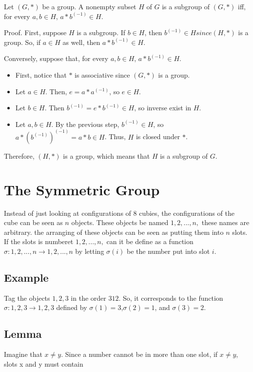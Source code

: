Let $(G,*)$ be a group. A nonempty subset $H$ of $G$ is a subgroup of $(G,*)$ iff, for every $a, b \in H$, $a * b^(-1) \in H$.

Proof. First, suppose $H$ is a subgroup. If $b \in H$, then $b^(-1) \in H since (H,*)$ is a group. So, if $a \in H$ as well, then $a * b^(-1) \in H$.

Conversely, suppose that, for every $a, b \in H$, $a * b^(-1) \in H$.

\begin {itemize}
\item First, notice that $*$ is associative since $(G,*)$ is a group.
\item Let $a \in H$. Then, $e = a * a^(-1)$, so $e \in H$.
\item Let $b \in H$. Then $b^(-1) = e * b^(-1) \in H$, so inverse exist in $H$.
\item Let $a, b \in H$. By the previous step, $b^(-1) \in H$, so $a* (b^(-1))^(-1) = a* b \in H$. Thus, $H$ is closed under $*$.
\end {itemize}

Therefore, $(H,*)$ is a group, which means that $H$ is a subgroup of $G$.

\section{The Symmetric Group}

Instead of just looking at configurations of 8 cubies, the configurations of the cube can be seen as $n$ objects. 
These objects be named $1, 2, . . . , n,$ these names are arbitrary. the arranging of these objects can be seen as
putting them into $n$ slots. If the slots is numberet $1, 2, . . . , n,$ can it be define as a function $\sigma : {1, 2, . . . , n} \rightarrow
{1, 2, . . . , n}$ by letting $\sigma(i)$ be the number put into slot $i$.

\subsection{Example} 
Tag the objects $1, 2, 3$ in the order $3 1 2$. So, it corresponds to the function $\sigma: {1, 2, 3} \rightarrow {1, 2, 3}$
defined by $\sigma(1) = 3$,$\sigma(2) = 1$, and $\sigma(3) = 2$.

\subsection{Lemma}

Imagine that $x\neq y$. Since a number cannot be in more than one slot, if $x \neq y$, slots x and y must contain

